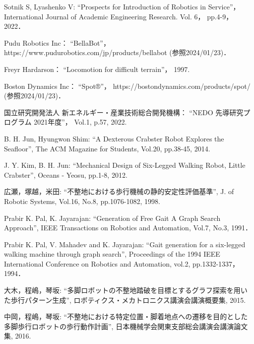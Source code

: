 ﻿\begin{thebibliography}{99}
    Sotnik S, Lyashenko V:
    ``Prospects for Introduction of Robotics in Service''，
    International Journal of Academic Engineering Research.
    Vol. 6，
    pp.4-9，
    2022．

    Pudu Robotics Inc：
    ``BellaBot''，
    https://www.pudurobotics.com/jp/products/bellabot (参照2024/01/23)．

    Freyr Hardarson：
    ``Locomotion for difficult terrain''，
    1997.

    Boston Dynamics Inc：
    ``Spot®''，
    https://bostondynamics.com/products/spot/ (参照2024/01/23)．

    国立研究開発法人 新エネルギー・産業技術総合開発機構：
    ``NEDO 先導研究プログラム 2021年度''，
    Vol.1,
    p.57, 
    2022. 

    B. H. Jun, Hyungwon Shim:
    ``A Dexterous Crabster Robot Explores the Seafloor'',
    The ACM Magazine for Students,
    Vol.20,
    pp.38-45,
    2014.

    J. Y. Kim, B. H. Jun:
    ``Mechanical Design of Six-Legged Walking Robot, Little Crabster'',
    Oceans - Yeosu,
    pp.1-8,
    2012.

    広瀬，塚越，米田: 
    ``不整地における歩行機械の静的安定性評価基準'', 
    J. of Robotic Systems,
    Vol.16, No.8, 
    pp.1076-1082, 
    1998.

    Prabir K. Pal, K. Jayarajan: 
    ``Generation of Free Gait A Graph Search Approach'',
    IEEE Transactions on Robotics and Automation,
    Vol.7, No.3,
    1991．

    Prabir K. Pal, V. Mahadev and K. Jayarajan:
    ``Gait generation for a six-legged walking machine through graph search'',
    Proceedings of the 1994 IEEE International Conference on Robotics and Automation,
    vol.2,
    pp.1332-1337，
    1994．

    大木，程嶋，琴坂: 
    ``多脚ロボットの不整地踏破を目標とするグラフ探索を用いた歩行パターン生成'', 
    ロボティクス・メカトロニクス講演会講演概要集,
    2015.   

    中岡，程嶋，琴坂: 
    ``不整地における特定位置・脚着地点への遷移を目的とした多脚歩行ロボットの歩行動作計画'',
    日本機械学会関東支部総会講演会講演論文集,
    2016.


\end{thebibliography}
